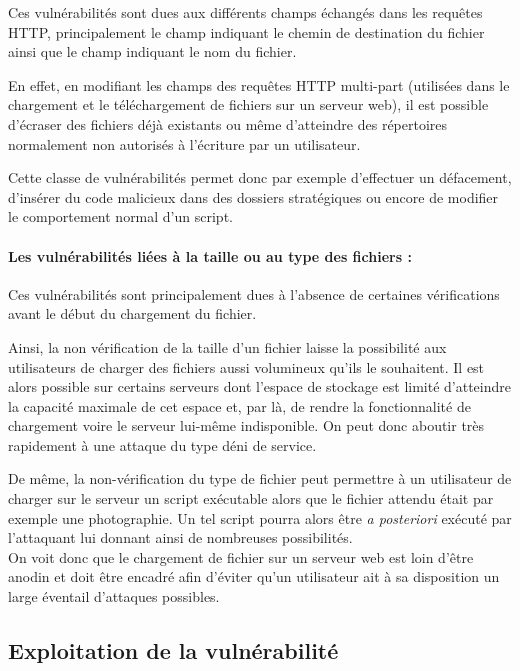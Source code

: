 Ces vulnérabilités sont dues aux différents champs échangés dans les requêtes HTTP, principalement le champ indiquant le chemin de destination du fichier ainsi que le champ indiquant le nom du fichier.

En effet, en modifiant les champs des requêtes HTTP multi-part (utilisées dans le chargement et le téléchargement de fichiers sur un serveur web), il est possible d'écraser des fichiers déjà existants ou même d'atteindre des répertoires normalement non autorisés à l'écriture par un utilisateur.

Cette classe de vulnérabilités permet donc par exemple d'effectuer un défacement, d'insérer du code malicieux dans des dossiers stratégiques ou encore de modifier le comportement normal d'un script.

\paragraph{Les vulnérabilités liées à la taille ou au type des fichiers :}

Ces vulnérabilités sont principalement dues à l'absence de certaines vérifications avant le début du chargement du fichier. 

Ainsi, la non vérification de la taille d'un fichier laisse la possibilité aux utilisateurs de charger des fichiers aussi volumineux qu'ils le souhaitent. Il est alors possible sur certains serveurs dont l'espace de stockage est limité d'atteindre la capacité maximale de cet espace et, par là, de rendre la fonctionnalité de chargement voire le serveur lui-même indisponible. On peut donc aboutir très rapidement à une attaque du type déni de service.

De même, la non-vérification du type de fichier peut permettre à un utilisateur de charger sur le serveur un script exécutable alors que le fichier attendu était par exemple une photographie. Un tel script pourra alors être \textit{a posteriori} exécuté par l'attaquant lui donnant ainsi de nombreuses possibilités.\\

On voit donc que le chargement de fichier sur un serveur web est loin d'être anodin et doit être encadré afin d'éviter qu'un utilisateur ait à sa disposition un large éventail d'attaques possibles.


\subsection{Exploitation de la vulnérabilité}

